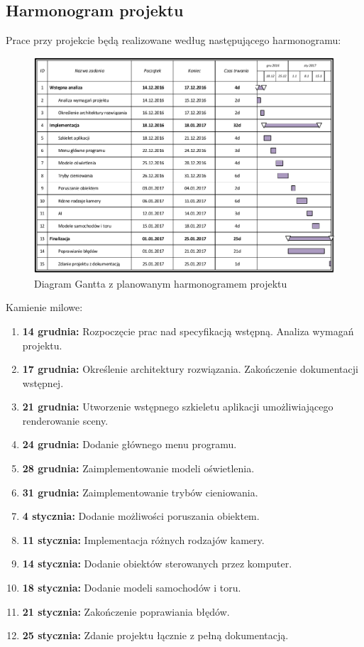 \documentclass[10pt,a4paper]{article}
\begin{document}
\subsection{Harmonogram projektu}
Prace przy projekcie będą realizowane według następującego harmonogramu:
\begin{figure}[H]
	\centering
	\includegraphics[width=16cm]{Resources/PDF/gantt.pdf}
	\caption{Diagram Gantta z planowanym harmonogramem projektu}
\end{figure}

\noindent
Kamienie milowe:
\begin{enumerate}
	\item \textbf{14 grudnia:} Rozpoczęcie prac nad specyfikacją wstępną. Analiza wymagań projektu.
	\item \textbf{17 grudnia:} Określenie architektury rozwiązania. Zakończenie dokumentacji wstępnej.
	\item \textbf{21 grudnia:} Utworzenie wstępnego szkieletu aplikacji umożliwiającego renderowanie sceny.
	\item \textbf{24 grudnia:} Dodanie głównego menu programu.
	\item \textbf{28 grudnia:} Zaimplementowanie modeli oświetlenia.
	\item \textbf{31 grudnia:} Zaimplementowanie trybów cieniowania.
	\item \textbf{4 stycznia:} Dodanie możliwości poruszania obiektem.
	\item \textbf{11 stycznia:} Implementacja różnych rodzajów kamery.
	\item \textbf{14 stycznia:} Dodanie obiektów sterowanych przez komputer.
	\item \textbf{18 stycznia:} Dodanie modeli samochodów i toru.
	\item \textbf{21 stycznia:} Zakończenie poprawiania błędów.
	\item \textbf{25 stycznia:} Zdanie projektu łącznie z pełną dokumentacją.
\end{enumerate}
\end{document}
